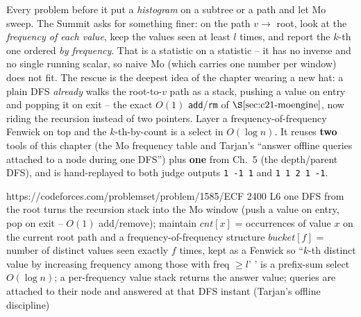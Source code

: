 
\begin{notebox}
Every problem before it put a \emph{histogram} on a subtree or a path and let Mo sweep.
The Summit asks for something finer: on the path \(v\to\) root, look at the
\emph{frequency of each value}, keep the values seen at least \(l\) times, and report the
\(k\)-th one ordered \emph{by frequency}. That is a statistic on a statistic -- it has no
inverse and no single running scalar, so naive Mo (which carries one number per window)
does not fit. The rescue is the deepest idea of the chapter wearing a new hat: a plain
DFS \emph{already} walks the root-to-\(v\) path as a stack, pushing a value on entry and
popping it on exit -- the exact \(O(1)\) \texttt{add}/\texttt{rm} of \(\secref{c21-moengine}\),
now riding the recursion instead of two pointers. Layer a frequency-of-frequency Fenwick
on top and the \(k\)-th-by-count is a select in \(O(\log n)\). It reuses \textbf{two}
tools of this chapter (the Mo frequency table and Tarjan's ``answer offline queries
attached to a node during one DFS'') plus \textbf{one} from Ch.~5 (the depth/parent DFS),
and is hand-replayed to both judge outputs \texttt{1 -1 1} and \texttt{1 1 2 1 -1}.
\end{notebox}

  {https://codeforces.com/problemset/problem/1585/E}{CF 2400 L6}
  {one DFS from the root turns the recursion stack into the Mo window (push a value on
   entry, pop on exit -- \(O(1)\) add/remove); maintain \(\mathit{cnt}[x]\) = occurrences
   of value \(x\) on the current root path and a frequency-of-frequency structure
   \(\mathit{bucket}[f]\) = number of distinct values seen exactly \(f\) times, kept as a
   Fenwick so ``\(k\)-th distinct value by increasing frequency among those with freq
   \(\ge l\)' ' is a prefix-sum select \(O(\log n)\); a per-frequency value stack returns
   the answer value; queries are attached to their node and answered at that DFS instant
   (Tarjan's offline discipline)}

